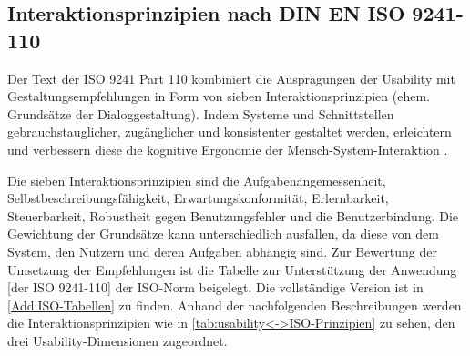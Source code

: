 \subsection{Interaktionsprinzipien nach DIN EN ISO 9241-110}   %
\label{ch:SdF:UI:sec:ISO-Interaktionsprinzipien}

Der Text der ISO 9241 Part 110 kombiniert die Ausprägungen der Usability mit Gestaltungsempfehlungen in Form von sieben Interaktionsprinzipien (ehem. Grundsätze der Dialoggestaltung). Indem Systeme und Schnittstellen gebrauchstauglicher, zugänglicher und konsistenter gestaltet werden, erleichtern und verbessern diese die kognitive Ergonomie der Mensch-System-Interaktion \cite{DIN_EN_ISO_9241-110}.

Die sieben Interaktionsprinzipien sind die Aufgabenangemessenheit, Selbstbeschreibungsfähigkeit, Erwartungskonformität, Erlernbarkeit, Steuerbarkeit, Robustheit gegen Benutzungsfehler und die Benutzerbindung. Die Gewichtung der Grundsätze kann unterschiedlich ausfallen, da diese von dem System, den Nutzern und deren Aufgaben abhängig sind. Zur Bewertung der Umsetzung der Empfehlungen ist die \glqq Tabelle zur Unterstützung der Anwendung [der ISO 9241-110]\grqq{} \cite{DIN_EN_ISO_9241-110} der ISO-Norm beigelegt. Die vollständige Version ist in \autoref{Add:ISO-Tabellen} zu finden.
Anhand der nachfolgenden Beschreibungen werden die Interaktionsprinzipien wie in \autoref{tab:usability<->ISO-Prinzipien} zu sehen, den drei Usability-Dimensionen zugeordnet.

